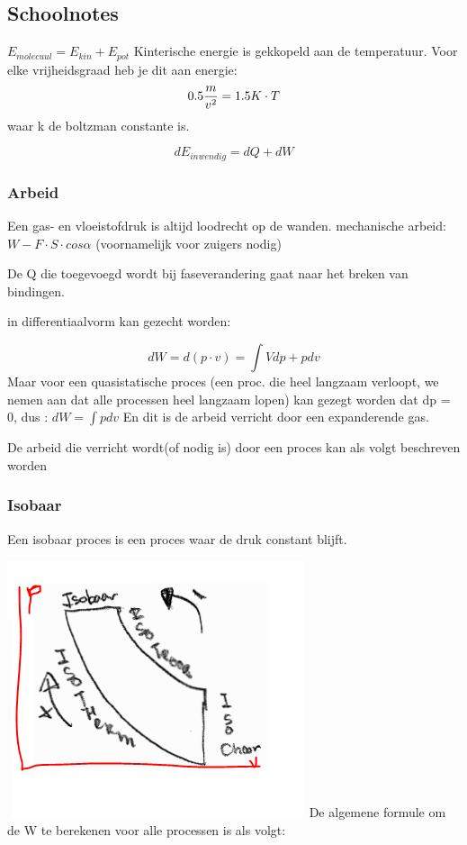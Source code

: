 \documentclass[12pt]{extarticle} %
\begin{document}
\subsection*{Schoolnotes}
$E_{molecuul} = E_{kin} + E_{pot}$
Kinterische energie is gekkopeld aan de temperatuur. Voor elke vrijheidsgraad heb je dit aan energie:
$$
0.5 {m\over v^2} = 1.5 K \cdot T
$$
waar k de boltzman constante is.

\begin{equation}\label{1e hoofdwet}
    dE_{inwendig} = dQ + dW
\end{equation}

\subsubsection{Arbeid}
Een gas- en vloeistofdruk is altijd loodrecht op de wanden. 
mechanische arbeid:  $W - F \cdot S \cdot cos \alpha$ (voornamelijk voor zuigers nodig)

De Q die toegevoegd wordt bij faseverandering gaat naar het breken van bindingen.

in differentiaalvorm kan gezecht worden:

$$
dW = d(p\cdot v) = \int V dp + p dv
$$
Maar voor een quasistatische proces (een proc. die heel langzaam verloopt, we nemen aan dat alle processen heel langzaam lopen)
 kan gezegt worden dat dp = 0, dus :
 $dW = \int p d v$
 En dit is de arbeid verricht door een expanderende gas.

 De arbeid die verricht wordt(of nodig is) door een proces kan als volgt beschreven worden 

 \subsubsection{Isobaar}
 Een isobaar proces is een proces waar de druk constant blijft. 

 \includegraphics{2.png}
 De algemene formule om de W te berekenen voor alle processen is als volgt:
\end{document}
